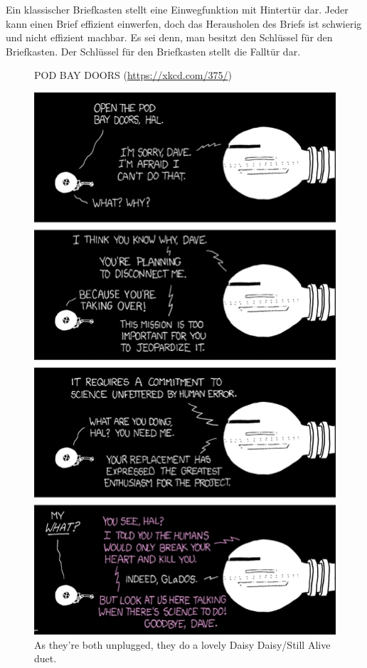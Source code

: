 \begin{example}
	Ein klassischer Briefkasten stellt eine Einwegfunktion mit Hintertür dar. Jeder kann einen Brief effizient einwerfen, doch das Herausholen des Briefs ist schwierig und nicht effizient machbar. Es sei denn, man besitzt den Schlüssel für den Briefkasten. Der Schlüssel für den Briefkasten stellt die Falltür dar.
\end{example}

\begin{figure}[htb]
	\centering
	\caption*{POD BAY DOORS (\url{https://xkcd.com/375/})}
	\includegraphics[scale=0.5]{pod_bay_doors}
	\caption{As they're both unplugged, they do a lovely Daisy Daisy/Still Alive duet.}
\end{figure}
